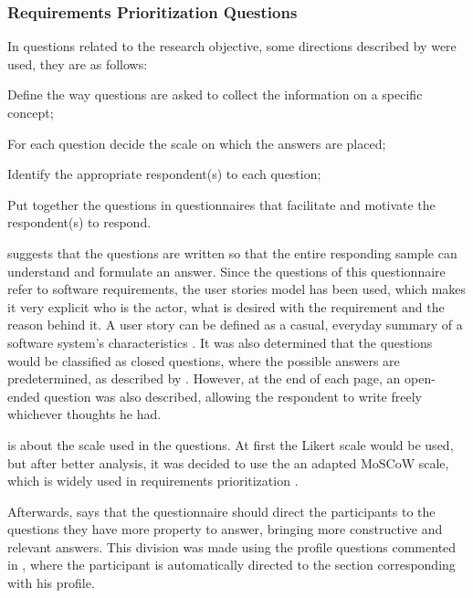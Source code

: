 \subsubsection{Requirements Prioritization Questions}

In questions related to the research objective, some directions described by \textcite{forza} were used, they are as follows:
\begin{inparaenum}[(1)]
  \item Define the way questions are asked to collect the information on a
  specific concept;\label{suggestion:1}
  \item For each question decide the scale on which the answers are placed;\label{suggestion:2}
  \item Identify the appropriate respondent(s) to each question;\label{suggestion:3}
  \item Put together the questions in questionnaires that facilitate and motivate the respondent(s) to respond.\label{suggestion:4}
\end{inparaenum}

 suggests that the questions are written so that the entire responding sample can understand and formulate an answer. Since the questions of this questionnaire refer to software requirements, the user stories model has been used, which makes it very explicit who is the actor, what is desired with the requirement and the reason behind it. A user story can be defined as a casual, everyday summary of a software system's characteristics \cite{DIMITRIJEVIC2015352}. It was also determined that the questions would be classified as closed questions, where the possible answers are predetermined, as described by \textcite{forza}. However, at the end of each page, an open-ended question was also described, allowing the respondent to write freely whichever thoughts he had.

 is about the scale used in the questions. At first the Likert scale \cite{joshi2015likert} would be used, but after better analysis, it was decided to use the an adapted \ac{MoSCoW} scale, which is widely used in requirements prioritization \cite{waters2009prioritization}.

Afterwards,  says that the questionnaire should direct the participants to the questions they have more property to answer, bringing more constructive and relevant answers. This division was made using the profile questions commented in , where the participant is automatically directed to the section corresponding with his profile.

